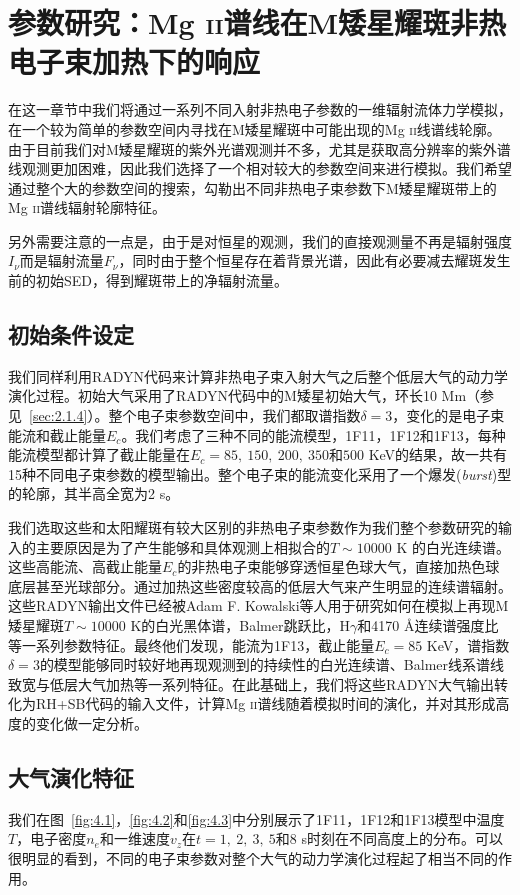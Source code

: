 
\chapter{参数研究：Mg \textsc{ii}谱线在M矮星耀斑非热电子束加热下的响应}\label{chap:4}
在这一章节中我们将通过一系列不同入射非热电子参数的一维辐射流体力学模拟，在一个较为简单的参数空间内寻找在M矮星耀斑中可能出现的Mg \textsc{ii}线谱线轮廓。由于目前我们对M矮星耀斑的紫外光谱观测并不多，尤其是获取高分辨率的紫外谱线观测更加困难\parencites{Hawley2007,Kowalski2019,Froning2019}，因此我们选择了一个相对较大的参数空间来进行模拟。我们希望通过整个大的参数空间的搜索，勾勒出不同非热电子束参数下M矮星耀斑带上的Mg \textsc{ii}谱线辐射轮廓特征。

另外需要注意的一点是，由于是对恒星的观测，我们的直接观测量不再是辐射强度$I_\nu$而是辐射流量$F_\nu$，同时由于整个恒星存在着背景光谱，因此有必要减去耀斑发生前的初始SED，得到耀斑带上的净辐射流量。
\section{初始条件设定}
我们同样利用RADYN代码来计算非热电子束入射大气之后整个低层大气的动力学演化过程。初始大气采用了RADYN代码中的M矮星初始大气，环长10 Mm（参见~\ref{sec:2.1.4}）。整个电子束参数空间中，我们都取谱指数$\delta = 3$，变化的是电子束能流和截止能量$E_c$。我们考虑了三种不同的能流模型，1F11，1F12和1F13，每种能流模型都计算了截止能量在$E_c = 85,\ 150,\ 200,\ 350$和$500$ KeV的结果，故一共有15种不同电子束参数的模型输出。整个电子束的能流变化采用了一个爆发(\textit{burst})型的轮廓\parencites{Aschwanden2004a,Aschwanden2004b}，其半高全宽为2 s。

我们选取这些和太阳耀斑有较大区别的非热电子束参数作为我们整个参数研究的输入的主要原因是为了产生能够和具体观测上相拟合的$T\sim 10000$ K 的白光连续谱。这些高能流、高截止能量$E_c$的非热电子束能够穿透恒星色球大气，直接加热色球底层甚至光球部分。通过加热这些密度较高的低层大气来产生明显的连续谱辐射。这些RADYN输出文件已经被Adam F. Kowalski等人用于研究如何在模拟上再现M矮星耀斑$T\sim 10000$ K的白光黑体谱，Balmer跳跃比，H$\gamma$和4170 \mbox{\AA}连续谱强度比等一系列参数特征。最终他们发现，能流为1F13，截止能量$E_c = 85$ KeV，谱指数$\delta = 3$的模型能够同时较好地再现观测到的持续性的白光连续谱、Balmer线系谱线致宽与低层大气加热等一系列特征。在此基础上，我们将这些RADYN大气输出转化为RH+SB代码的输入文件，计算Mg \textsc{ii}谱线随着模拟时间的演化，并对其形成高度的变化做一定分析。
\section{大气演化特征}\label{sec:4.2}
我们在图~\ref{fig:4.1}，\ref{fig:4.2}和\ref{fig:4.3}中分别展示了1F11，1F12和1F13模型中温度$T$，电子密度$n_e$和一维速度$v_z$在$t=1,\ 2,\ 3,\ 5$和8 s时刻在不同高度上的分布。可以很明显的看到，不同的电子束参数对整个大气的动力学演化过程起了相当不同的作用。

